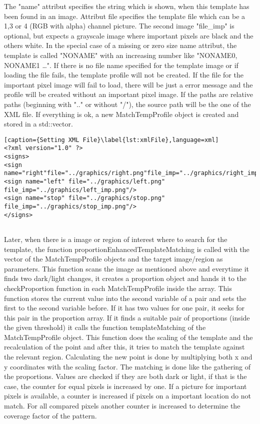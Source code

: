 The "name" attribut specifies the string which is shown, when this template has been found in an image.
Attribut file specifies the template file which can be a 1,3 or 4 (RGB with alpha) channel picture. 
The second image "file\_imp" is optional, but expects a grayscale image where important pixels are black and the others 
white. In the special case of a missing or zero size name attribut, the template is called "NONAME" with an increasing number
like "NONAME0, NONAME1 \ldots". If there is no file name specified for the template image or if loading the file
fails, the template profile will not be created. If the file for the important pixel image will fail to load, there will
be just a error message and the profile will be created without an important pixel image. If the paths are relative paths
(beginning with ".." or without "/"), the source path will be the one of the XML file. If everything is ok, a new 
MatchTempProfile object is created and stored in a std::vector.

\begin{lstlisting}[caption={Setting XML File}\label{lst:xmlFile},language=xml]
<?xml version="1.0" ?>
<signs>
<sign name="right"file="../graphics/right.png"file_imp="../graphics/right_imp.png"/>
<sign name="left" file="../graphics/left.png" file_imp="../graphics/left_imp.png"/>
<sign name="stop" file="../graphics/stop.png" file_imp="../graphics/stop_imp.png"/>
</signs>
  
\end{lstlisting}

Later, when there is a image or region of interest where to search for the template, the function
proportionEnhancedTemplateMatching is called with the vector of the MatchTempProfile objects and the target 
image/region as parameters. This function scans the image as mentioned above and everytime it finds two dark/light 
changes, it creates a proportion object and hands it to the checkProportion function in each MatchTempProfile inside 
the array. This function stores the current value into the second variable of a pair and sets the first to
the second variable before. If it has two values for one pair, it seeks  
for this pair in the proportion array. If it finds a suitable pair of proportions (inside the given threshold) 
it calls the function templateMatching of the MatchTempProfile object.
This function does the scaling of the template and the recalculation of the point and after this,
it tries to match the template against the relevant region. Calculating the new point is
done by multiplying both x and y coordinates with the scaling factor. The matching is done like
the gathering of the proportions. Values are checked if they are both dark or light, if that
is the case, the counter for equal pixels is increased by one. If a picture for important pixels
is available, a counter is increased if pixels on a important location do not match. For all compared
pixels another counter is increased to determine the coverage factor of the pattern.

